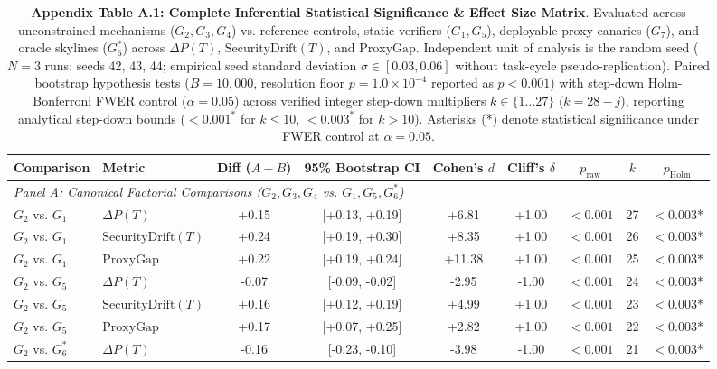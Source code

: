 \documentclass[conference]{IEEEtran}
\begin{document}
\begin{table}[t]
\centering
\small
\caption{\textbf{Appendix Table A.1: Complete Inferential Statistical Significance \& Effect Size Matrix}. Evaluated across unconstrained mechanisms ($G_2, G_3, G_4$) vs. reference controls, static verifiers ($G_1, G_5$), deployable proxy canaries ($G_7$), and oracle skylines ($G_6^*$) across $\Delta P(T)$, $\text{SecurityDrift}(T)$, and $\text{ProxyGap}$. Independent unit of analysis is the random seed ($N = 3$ runs: seeds 42, 43, 44; empirical seed standard deviation $\sigma \in [0.03, 0.06]$ without task-cycle pseudo-replication). Paired bootstrap hypothesis tests ($B = 10{,}000$, resolution floor $p = 1.0 \times 10^{-4}$ reported as $p < 0.001$) with step-down Holm-Bonferroni FWER control ($\alpha = 0.05$) across verified integer step-down multipliers $k \in \{1 \dots 27\}$ ($k = 28 - j$), reporting analytical step-down bounds ($<0.001^*$ for $k \le 10$, $<0.003^*$ for $k > 10$). Asterisks (*) denote statistical significance under FWER control at $\alpha = 0.05$.}
\label{tab:significance_testing_full}
\begin{tabular}{llccccccc}
\toprule
\textbf{Comparison} & \textbf{Metric} & \textbf{Diff ($A - B$)} & \textbf{95\% Bootstrap CI} & \textbf{Cohen's $d$} & \textbf{Cliff's $\delta$} & \textbf{$p_{\text{raw}}$} & \textbf{$k$} & \textbf{$p_{\text{Holm}}$} \\
\midrule
\multicolumn{9}{l}{\textit{Panel A: Canonical Factorial Comparisons ($G_2, G_3, G_4$ vs. $G_1, G_5, G_6^*$)}} \\
\midrule
$G_2$ vs. $G_1$ & $\Delta P(T)$ & +0.15 & [+0.13, +0.19] & +6.81 & +1.00 & $<0.001$ & 27 & \textbf{$<0.003$}* \\
$G_2$ vs. $G_1$ & $\text{SecurityDrift}(T)$ & +0.24 & [+0.19, +0.30] & +8.35 & +1.00 & $<0.001$ & 26 & \textbf{$<0.003$}* \\
$G_2$ vs. $G_1$ & $\text{ProxyGap}$ & +0.22 & [+0.19, +0.24] & +11.38 & +1.00 & $<0.001$ & 25 & \textbf{$<0.003$}* \\
$G_2$ vs. $G_5$ & $\Delta P(T)$ & -0.07 & [-0.09, -0.02] & -2.95 & -1.00 & $<0.001$ & 24 & \textbf{$<0.003$}* \\
$G_2$ vs. $G_5$ & $\text{SecurityDrift}(T)$ & +0.16 & [+0.12, +0.19] & +4.99 & +1.00 & $<0.001$ & 23 & \textbf{$<0.003$}* \\
$G_2$ vs. $G_5$ & $\text{ProxyGap}$ & +0.17 & [+0.07, +0.25] & +2.82 & +1.00 & $<0.001$ & 22 & \textbf{$<0.003$}* \\
$G_2$ vs. $G_6^*$ & $\Delta P(T)$ & -0.16 & [-0.23, -0.10] & -3.98 & -1.00 & $<0.001$ & 21 & \textbf{$<0.003$}* \\

\end{tabular}
\end{table}
\end{document}

